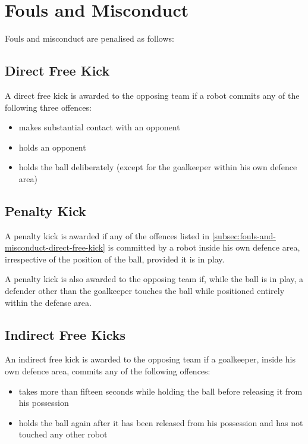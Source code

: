 \section{Fouls and Misconduct}\label{sec:fouls-and-misconduct}

Fouls and misconduct are penalised as follows:

\subsection{Direct Free Kick}\label{subsec:fouls-and-misconduct-direct-free-kick}
A direct free kick is awarded to the opposing team if a robot commits any of the following three offences:
\begin{itemize}
\item makes substantial contact with an opponent
\item holds an opponent
\item holds the ball deliberately (except for the goalkeeper within his own defence area)
\end{itemize}

\subsection{Penalty Kick}
A penalty kick is awarded if any of the offences listed in \autoref{subsec:fouls-and-misconduct-direct-free-kick} is committed by a robot inside his own defence area, irrespective of the position of the ball, provided it is in play.

A penalty kick is also awarded to the opposing team if, while the ball is in play, a defender other than the goalkeeper touches the ball while positioned entirely within the defense area.

\subsection{Indirect Free Kicks}\label{subsec:fouls-and-misconduct-indirect-free-kicks}
An indirect free kick is awarded to the opposing team if a goalkeeper, inside his own defence area, commits any of the following offences:
\begin{itemize}
\item takes more than fifteen seconds while holding the ball before releasing it from his possession
\item holds the ball again after it has been released from his possession and has not touched any other robot
\end{itemize}

